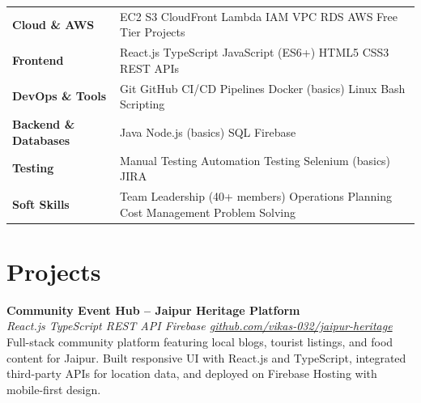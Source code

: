 \documentclass[10pt, a4paper]{article}
\newcommand{\projentry}[3]{%
  {\small\bfseries\color{myDark}#1}\\[-3pt]
  {\footnotesize\color{myAcc}\textit{#2}}\\[-1pt]
  {\footnotesize\color{myBody}#3}\par\vspace{2pt}%
}
\begin{document}
\renewcommand{\arraystretch}{1.1}
\noindent\begin{tabularx}{\linewidth}{@{} p{36mm} X @{}}
  {\footnotesize\bfseries\color{myDark}Cloud \& AWS}          & {\footnotesize\color{myBody}EC2 \textbullet{} S3 \textbullet{} CloudFront \textbullet{} Lambda \textbullet{} IAM \textbullet{} VPC \textbullet{} RDS \textbullet{} AWS Free Tier Projects} \\
  {\footnotesize\bfseries\color{myDark}Frontend}              & {\footnotesize\color{myBody}React.js \textbullet{} TypeScript \textbullet{} JavaScript (ES6+) \textbullet{} HTML5 \textbullet{} CSS3 \textbullet{} REST APIs} \\
  {\footnotesize\bfseries\color{myDark}DevOps \& Tools}       & {\footnotesize\color{myBody}Git \textbullet{} GitHub \textbullet{} CI/CD Pipelines \textbullet{} Docker (basics) \textbullet{} Linux \textbullet{} Bash Scripting} \\
  {\footnotesize\bfseries\color{myDark}Backend \& Databases}  & {\footnotesize\color{myBody}Java \textbullet{} Node.js (basics) \textbullet{} SQL \textbullet{} Firebase} \\
  {\footnotesize\bfseries\color{myDark}Testing}               & {\footnotesize\color{myBody}Manual Testing \textbullet{} Automation Testing \textbullet{} Selenium (basics) \textbullet{} JIRA} \\
  {\footnotesize\bfseries\color{myDark}Soft Skills}           & {\footnotesize\color{myBody}Team Leadership (40+ members) \textbullet{} Operations Planning \textbullet{} Cost Management \textbullet{} Problem Solving} \\
\end{tabularx}
\renewcommand{\arraystretch}{1}

\section{Projects}

\projentry
  {Community Event Hub -- Jaipur Heritage Platform}
  {React.js \textbullet{} TypeScript \textbullet{} REST API \textbullet{} Firebase \textbar{}
   \href{https://github.com/vikas-032/jaipur-heritage}{github.com/vikas-032/jaipur-heritage}}
  {Full-stack community platform featuring local blogs, tourist listings, and food content for Jaipur.
   Built responsive UI with React.js and TypeScript, integrated third-party APIs for location data,
   and deployed on Firebase Hosting with mobile-first design.}
\end{document}
